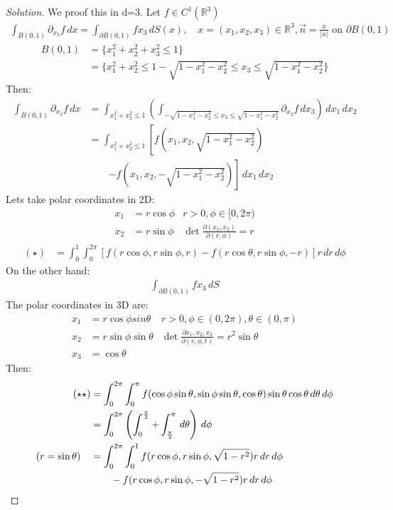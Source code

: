 \documentclass{report}
\theoremstyle{tommy}
\begin{document}
  \begin{proof}[Solution]
    We proof this in d=3. Let \(f \in C^1(\mathbb{R}^3)\)
    \begin{align*}
      \int_{B(0, 1)} \partial_{x_3} f \, dx = \int_{\partial B(0, 1)} f x_3 \, dS(x), \quad x = (x_1, x_2, x_3) \in \mathbb{R}^3, \vec{n} = \frac{x}{|x|} \text{ on } \partial B(0,1)
    \end{align*}
    \begin{align*}
      B(0,1) &
      = \{x_1^2 + x_2^2 + x_3^2 \le 1 \} \\
      &= \{ x_1^2+ x_2^2 \le 1 - \sqrt{1 - x_1^2 - x_2^2} \le x_3 \le \sqrt{1 - x_1^2 - x_2^2}\}
    \end{align*}
    Then: 
    \begin{align*}
      \int_{B(0,1)} \partial_{x_3} f \, dx 
      &= \int_{x_1^2 + x_2^2 \le 1} \left(\int_{-\sqrt{1 - x_1^2 - x_2^2} \le x_3 \le \sqrt{1 - x_1^2 -x_2^2}} \partial_{x_3} f \, dx_3\right) \, dx_1 \, dx_2 \\
      &= \int_{x_1^2 + x_2^2 \le 1} \left[f(x_1, x_2, \sqrt{1 - x_1^2 - x_2^2})\right. \\
      &\qquad \left. - f(x_1, x_2, - \sqrt{1 - x_1^2 - x_2^2})\right] \, dx_1 \, dx_2
    \end{align*}
    Lets take polar coordinates in 2D:\begin{align*}
      x_1 &= r \cos \phi & r > 0, \phi \in [0, 2 \pi)\\
      x_2 &= r \sin \phi & \det \frac{\partial(x_1, x_2)}{\partial(r, \phi)} = r
    \end{align*}
    \begin{align*}
      (\star) &= \int_0^1 \int_0^{2 \pi} [f(r \cos \phi, r \sin \phi, r) - f(r \cos \theta, r \sin \phi, -r)] r \, dr \, d\phi
    \end{align*}
    On the other hand:
    \begin{align*}
      \int_{\partial B(0, 1)} f x_3 \, dS
    \end{align*}
    The polar coordinates in 3D are:
    \begin{align*}
      x_1 &= r \cos \phi sin \theta& r > 0, \phi \in (0, 2 \pi), \theta \in (0, \pi) \\
      x_2 &= r \sin \phi \sin \theta & \det \frac{\partial{x_1, x_2, x_3}}{\partial(r, \phi, t)} = r^2 \sin \theta\\
      x_3 &= \cos \theta
    \end{align*}
    Then: 
    \begin{align*}
      (\star \star) 
      &= \int_0^{2 \pi} \int_0^\pi f(\cos \phi \sin \theta, \sin \phi \sin \theta, \cos \theta) \sin \theta \cos \theta \, d \theta \, d \phi \\
      &= \int_0^{2 \pi} \left(\int_0^{\frac{\pi}{2}} + \int_{\frac{\pi}{2}}^\pi \, d \theta\right) \, d \phi \\
      (r = \sin \theta) \quad &= \int_0^{2 \pi} \int_0^1 f(r \cos \phi, r \sin \phi, \sqrt{1 - r^2}) r \, dr \, d \phi \\
      &\qquad - f(r \cos \phi, r \sin \phi, -\sqrt{1 - r^2}) r \, dr \, d\phi \qedhere
    \end{align*}
  \end{proof}
\end{document}
